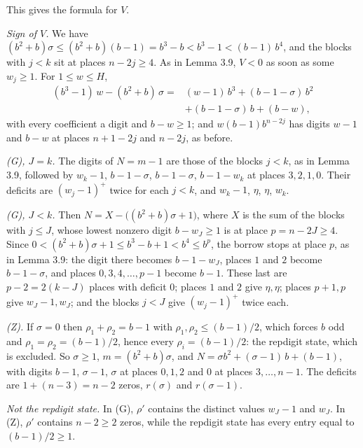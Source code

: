 \documentclass[11pt,letterpaper]{article}
\theoremstyle{paperstyle}
\theoremstyle{paperstyledef}
\theoremstyle{paperstylerem}
\begin{document}
This gives the formula for \(V\).

\emph{Sign of \(V\).} We have \((b^2 + b)\sigma \leq (b^2+b)(b-1) = b^3 - b < b^3 - 1 < (b-1)\, b^4\), and the blocks with \(j < k\) sit at places \(n - 2j \geq 4\). As in Lemma 3.9, \(V < 0\) as soon as some \(w_j \geq 1\). For \(1 \leq w \leq H\), \[\begin{aligned} (b^3 - 1)\,w - (b^2 + b)\,\sigma = {} & (w-1)\,b^3 + (b-1-\sigma)\,b^2 \\ & + (b-1-\sigma)\,b + (b-w), \end{aligned}\] with every coefficient a digit and \(b - w \geq 1\); and \(w(b-1) b^{n-2j}\) has digits \(w - 1\) and \(b - w\) at places \(n+1-2j\) and \(n-2j\), as before.

\emph{(G), \(J = k\).} The digits of \(N = m - 1\) are those of the blocks \(j < k\), as in Lemma 3.9, followed by \(w_k - 1\), \(b-1-\sigma\), \(b-1-\sigma\), \(b-1-w_k\) at places \(3, 2, 1, 0\). Their deficits are \((w_j-1)^+\) twice for each \(j < k\), and \(w_k - 1\), \(\eta\), \(\eta\), \(w_k\).

\emph{(G), \(J < k\).} Then \(N = X - \bigl((b^2+b)\sigma + 1\bigr)\), where \(X\) is the sum of the blocks with \(j \leq J\), whose lowest nonzero digit \(b - w_J \geq 1\) is at place \(p = n - 2J \geq 4\). Since \(0 < (b^2 + b)\sigma + 1 \leq b^3 - b + 1 < b^4 \leq b^p\), the borrow stops at place \(p\), as in Lemma 3.9: the digit there becomes \(b - 1 - w_J\), places \(1\) and \(2\) become \(b - 1 - \sigma\), and places \(0, 3, 4, \dots, p-1\) become \(b - 1\). These last are \(p - 2 = 2(k-J)\) places with deficit \(0\); places \(1\) and \(2\) give \(\eta, \eta\); places \(p+1, p\) give \(w_J - 1, w_J\); and the blocks \(j < J\) give \((w_j - 1)^+\) twice each.

\emph{(Z).} If \(\sigma = 0\) then \(\rho_1 + \rho_2 = b - 1\) with \(\rho_1, \rho_2 \leq (b-1)/2\), which forces \(b\) odd and \(\rho_1 = \rho_2 = (b-1)/2\), hence every \(\rho_i = (b-1)/2\): the repdigit state, which is excluded. So \(\sigma \geq 1\), \(m = (b^2 + b)\sigma\), and \(N = \sigma b^2 + (\sigma - 1)\, b + (b-1)\), with digits \(b-1\), \(\sigma-1\), \(\sigma\) at places \(0, 1, 2\) and \(0\) at places \(3, \dots, n-1\). The deficits are \(1 + (n-3) = n-2\) zeros, \(r(\sigma)\) and \(r(\sigma - 1)\).

\emph{Not the repdigit state.} In (G), \(\rho'\) contains the distinct values \(w_J - 1\) and \(w_J\). In (Z), \(\rho'\) contains \(n - 2 \geq 2\) zeros, while the repdigit state has every entry equal to \((b-1)/2 \geq 1\).
\end{document}
